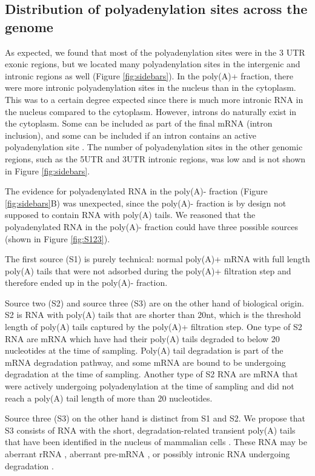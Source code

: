 \subsection{Distribution of polyadenylation sites across the genome}
As expected, we found that most of the polyadenylation sites were in the 3\ppp
UTR exonic regions, but we located many polyadenylation sites in the intergenic
and intronic regions as well (Figure \ref{fig:sidebars}). In the poly(A)+
fraction, there were more intronic polyadenylation sites in the nucleus than in
the cytoplasm. This was to a certain degree expected since there is much more
intronic RNA in the nucleus compared to the cytoplasm. However, introns do
naturally exist in the cytoplasm. Some can be included as part of the final
mRNA (intron inclusion), and some can be included if an intron contains an
active polyadenylation site \cite{tian_widespread_2007}. The number of
polyadenylation sites in the other genomic regions, such as the 5\ppp UTR and
3\ppp UTR intronic regions, was low and is not shown in Figure
\ref{fig:sidebars}.

The evidence for polyadenylated RNA in the poly(A)- fraction (Figure
\ref{fig:sidebars}B) was unexpected, since the poly(A)- fraction is by design
not supposed to contain RNA with poly(A) tails. We reasoned that the
polyadenylated RNA in the poly(A)- fraction could have three possible sources
(shown in Figure \ref{fig:S123}).

The first source (S1) is purely technical: normal poly(A)+ mRNA with full
length poly(A) tails that were not adsorbed during the poly(A)+ filtration step
and therefore ended up in the poly(A)- fraction.

Source two (S2) and source three (S3) are on the other hand of biological
origin. S2 is RNA with poly(A) tails that are shorter than 20nt, which is the
threshold length of poly(A) tails captured by the poly(A)+ filtration
step. One type of S2 RNA are mRNA which have had their poly(A) tails degraded to
below 20 nucleotides at the time of sampling. Poly(A) tail degradation is part
of the mRNA degradation pathway, and some mRNA are bound to be undergoing
degradation at the time of sampling. Another type of S2 RNA are mRNA that were
actively undergoing polyadenylation at the time of sampling and did not reach a
poly(A) tail length of more than 20 nucleotides.

Source three (S3) on the other hand is distinct from S1 and S2. We propose that
S3 consists of RNA with the short, degradation-related transient poly(A) tails
that have been identified in the nucleus of mammalian cells
\cite{lemay_nuclear_2010}.  These RNA may be aberrant rRNA
\cite{shcherbik_polyadenylation_2010}, aberrant pre-mRNA
\cite{west_adenylation_2006}, or possibly intronic RNA undergoing degradation
\cite{schmidt_polyadenylation_2010}.

